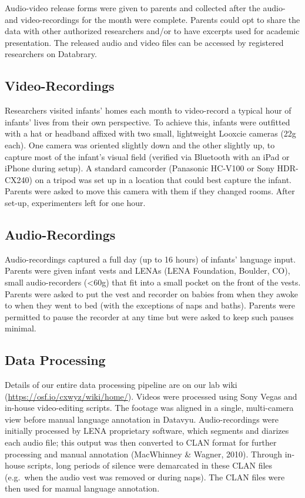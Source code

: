 \documentclass[floatsintext,man]{apa6}
\theoremstyle{definition}
\theoremstyle{definition}
\theoremstyle{definition}
\theoremstyle{remark}
\begin{document}
Audio-video release forms were given to parents and collected after the
audio- and video-recordings for the month were complete. Parents could
opt to share the data with other authorized researchers and/or to have
excerpts used for academic presentation. The released audio and video
files can be accessed by registered researchers on Databrary.

\hypertarget{video-recordings}{%
\subsection{Video-Recordings}\label{video-recordings}}

Researchers visited infants' homes each month to video-record a typical
hour of infants' lives from their own perspective. To achieve this,
infants were outfitted with a hat or headband affixed with two small,
lightweight Looxcie cameras (22g each). One camera was oriented slightly
down and the other slightly up, to capture most of the infant's visual
field (verified via Bluetooth with an iPad or iPhone during setup). A
standard camcorder (Panasonic HC-V100 or Sony HDR-CX240) on a tripod was
set up in a location that could best capture the infant. Parents were
asked to move this camera with them if they changed rooms. After set-up,
experimenters left for one hour.

\hypertarget{audio-recordings}{%
\subsection{Audio-Recordings}\label{audio-recordings}}

Audio-recordings captured a full day (up to 16 hours) of infants'
language input. Parents were given infant vests and LENAs (LENA
Foundation, Boulder, CO), small audio-recorders (\textless{}60g) that
fit into a small pocket on the front of the vests. Parents were asked to
put the vest and recorder on babies from when they awoke to when they
went to bed (with the exceptions of naps and baths). Parents were
permitted to pause the recorder at any time but were asked to keep such
pauses minimal.

\hypertarget{data-processing}{%
\subsection{Data Processing}\label{data-processing}}

Details of our entire data processing pipeline are on our lab wiki
(\url{https://osf.io/cxwyz/wiki/home/}). Videos were processed using
Sony Vegas and in-house video-editing scripts. The footage was aligned
in a single, multi-camera view before manual language annotation in
Datavyu. Audio-recordings were initially processed by LENA proprietary
software, which segments and diarizes each audio file; this output was
then converted to CLAN format for further processing and manual
annotation (MacWhinney \& Wagner, 2010). Through in-house scripts, long
periods of silence were demarcated in these CLAN files (e.g.~when the
audio vest was removed or during naps). The CLAN files were then used
for manual language annotation.
\end{document}
